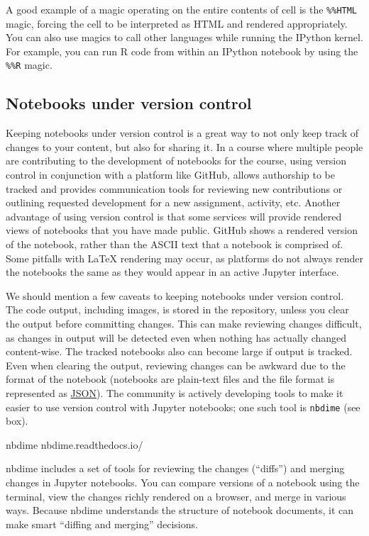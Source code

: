 \documentclass[]{book}
\begin{document}
A good example of a magic operating on the entire contents of cell is
the \texttt{\%\%HTML} magic, forcing the cell to be interpreted as HTML
and rendered appropriately. You can also use magics to call other
languages while running the IPython kernel. For example, you can run R
code from within an IPython notebook by using the \texttt{\%\%R} magic.

\subsection{Notebooks under version
control}\label{notebooks-under-version-control}

Keeping notebooks under version control is a great way to not only keep
track of changes to your content, but also for sharing it. In a course
where multiple people are contributing to the development of notebooks
for the course, using version control in conjunction with a platform
like GitHub, allows authorship to be tracked and provides communication
tools for reviewing new contributions or outlining requested development
for a new assignment, activity, etc. Another advantage of using version
control is that some services will provide rendered views of notebooks
that you have made public. GitHub shows a rendered version of the
notebook, rather than the ASCII text that a notebook is comprised of.
Some pitfalls with LaTeX rendering may occur, as platforms do not always
render the notebooks the same as they would appear in an active Jupyter
interface.

We should mention a few caveats to keeping notebooks under version
control. The code output, including images, is stored in the repository,
unless you clear the output before committing changes. This can make
reviewing changes difficult, as changes in output will be detected even
when nothing has actually changed content-wise. The tracked notebooks
also can become large if output is tracked. Even when clearing the
output, reviewing changes can be awkward due to the format of the
notebook (notebooks are plain-text files and the file format is
represented as \href{https://www.json.org/}{JSON}). The community is
actively developing tools to make it easier to use version control with
Jupyter notebooks; one such tool is \texttt{nbdime} (see box).

nbdime nbdime.readthedocs.io/

nbdime includes a set of tools for reviewing the changes (``diffs'') and
merging changes in Jupyter notebooks. You can compare versions of a
notebook using the terminal, view the changes richly rendered on a
browser, and merge in various ways. Because nbdime understands the
structure of notebook documents, it can make smart ``diffing and
merging'' decisions.
\end{document}
